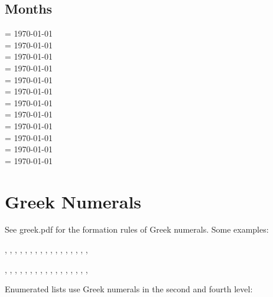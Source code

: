 \documentclass[a4paper]{article}
\begin{document}
\subsection{Months}

 \month=\value{foo} \today \\
 \month=\value{foo} \today \\
 \month=\value{foo} \today \\
 \month=\value{foo} \today \\
 \month=\value{foo} \today \\
 \month=\value{foo} \today \\
 \month=\value{foo} \today \\
 \month=\value{foo} \today \\
 \month=\value{foo} \today \\
 \month=\value{foo} \today \\
 \month=\value{foo} \today \\
 \month=\value{foo} \today \\

\section{Greek Numerals}

See greek.pdf for the formation rules of Greek numerals.
Some examples:


,
,
,
,
,
,
,
,
,
,
,
,
,
,
,
,
,

,
,
,
,
,
,
,
,
,
,
,
,
,
,
,
,
,


Enumerated lists use Greek numerals in the second and fourth level:
\end{document}
